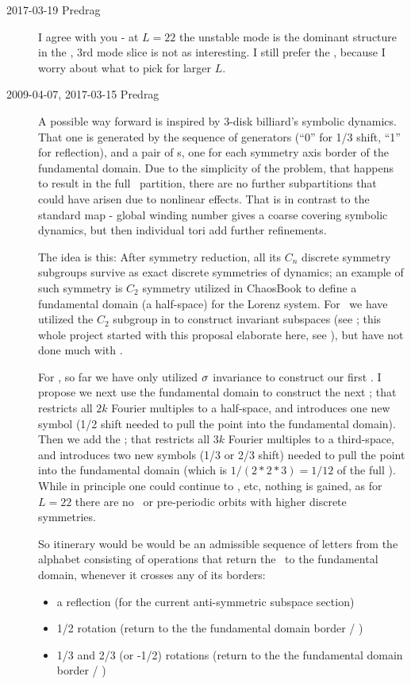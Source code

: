 \begin{description}
\item[2017-03-19 Predrag]
I agree with you - at $L=22$ the  unstable mode is the dominant
structure in the \statesp, 3rd mode slice is not as interesting. I still
prefer the {\fFslice}, because I worry about what to pick for larger  $L$.

\item[2009-04-07, 2017-03-15 Predrag]
A possible way forward is inspired by 3-disk billiard's symbolic
dynamics. That one is generated by the sequence of  generators
(``0'' for 1/3 shift, ``1'' for reflection), and a pair of \PoincSec s,
one for each symmetry axis border of the fundamental domain.
Due to the simplicity of the problem, that happens to result in the full
\statesp\ partition, there are no further subpartitions that could have
arisen due to nonlinear effects. That is in contrast to the standard map
- global winding number gives a coarse covering symbolic dynamics, but
then individual tori add further refinements.

The idea is this: After  symmetry reduction, all its $C_n$
discrete symmetry subgroups survive as exact discrete symmetries of
dynamics; an example of such symmetry is $C_2$ symmetry utilized in
ChaosBook to define a fundamental domain (a half-space) for the Lorenz
system. For \KS\ we have utilized the $C_2$ subgroup in  to
construct  invariant subspaces (see ; this whole
project started with this proposal elaborate here, see
), but have not done much with .

For \KS, so far we have only utilized $\sigma$ invariance to construct our
first \PoincSec. I propose we next use the  fundamental domain to
construct the next \PoincSec; that restricts all $2k$ Fourier multiples
to a half-space, and introduces one new symbol (1/2 shift needed to pull
the point into the fundamental domain). Then we add the  \PoincSec;
that restricts all $3k$ Fourier multiples to a third-space, and
introduces two new symbols (1/3 or 2/3 shift) needed to pull the point
into the fundamental domain (which is $1/(2*2*3)=1/12$ of the full
\statesp). While in principle one could continue to  \PoincSec,
etc, nothing is gained, as for $L=22$ there are no \reqva\ or
pre-periodic orbits with higher discrete symmetries.

So itinerary would be would be an admissible sequence of letters from
the alphabet consisting of operations that return the \statesp\ to
the fundamental domain, whenever it crosses any of its borders:
\begin{itemize}
  \item a reflection (for the current anti-symmetric subspace section)
  \item 1/2 rotation (return to the the  fundamental domain border / \PoincSec)
  \item 1/3 and 2/3 (or -1/2) rotations
  (return to the the  fundamental domain border / \PoincSec)
\end{itemize}


\end{description}

